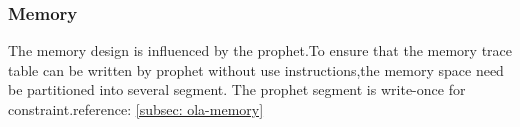 \subsubsection{Memory} \label{sec:design-memory}

The memory design is influenced by the prophet.To ensure that the memory trace table can be written by prophet without use instructions,the memory space need be partitioned into several segment.
The prophet segment is write-once for constraint.reference: \ref{subsec: ola-memory}